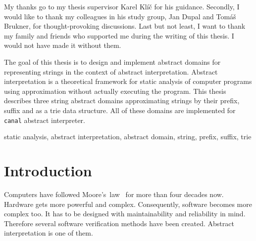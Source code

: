 \documentclass[12pt,final,oneside]{fithesis2}
\theoremstyle{definition}
\newcommand\emptypage{\newpage\null\thispagestyle{empty}\newpage}
\begin{document}
\FrontMatter
\ThesisTitlePage

\emptypage

\begin{ThesisDeclaration}
  \DeclarationText
  \AdvisorName
\end{ThesisDeclaration}

\begin{ThesisThanks}
My thanks go to my thesis supervisor Karel Klíč for his guidance. Secondly,
I would like to thank my colleagues in his study group, Jan Dupal and
Tomáš Brukner, for thought-provoking discussions. Last but not least, I want
to thank my family and friends who supported me during the writing of this
thesis. I would not have made it without them.
\end{ThesisThanks}

\begin{ThesisAbstract}
The goal of this thesis is to design and implement abstract domains for
representing strings in the context of abstract interpretation. Abstract
interpretation is a theoretical framework for static analysis of computer
programs using approximation without actually executing the program. This
thesis describes three string abstract domains approximating strings by their
prefix, suffix and as a trie data structure. All of these domains are
implemented for \texttt{canal} abstract interpreter.
\end{ThesisAbstract}

\begin{ThesisKeyWords}
static analysis, abstract interpretation, abstract domain, string,
prefix, suffix, trie
\end{ThesisKeyWords}

\MainMatter

\tableofcontents


\chapter{Introduction}

Computers have followed Moore's~law~\cite{Moore65-1} for more than
four decades now. Hardware gets more powerful and complex. Consequently,
software becomes more complex too. It has to be designed
with maintainability and reliability in mind. Therefore several software
verification methods have been created. Abstract interpretation is one
of them.
\end{document}
